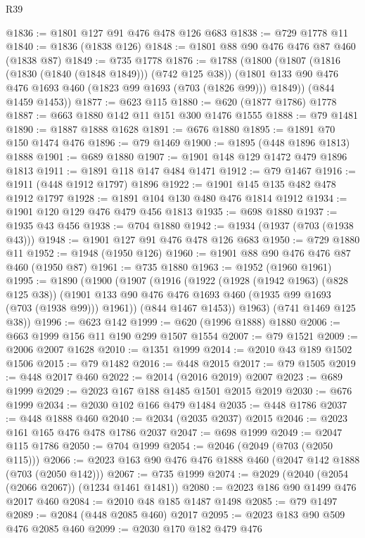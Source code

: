 \begin{lexlean}{R39}
\begin{coremodule}
@1836 := @1801 @127 @91 @476 @478 @126 @683
@1838 := @729 @1778 @11
@1840 := @1836 (@1838 @126)
@1848 := @1801 @88 @90 @476 @476 @87 @460 (@1838 @87)
@1849 := @735 @1778
@1876 := @1788
    (@1800
      (@1807
        (@1816 (@1830 (@1840 (@1848 @1849))) (@742 @125 @38))
        (@1801 @133 @90 @476 @476 @1693 @460 (@1823 @99 @1693 (@703 (@1826 @99))) @1849))
      (@844 @1459 @1453))
@1877 := @623 @115
@1880 := @620 (@1877 @1786) @1778
@1887 := @663 @1880 @142 @11 @151 @300 @1476 @1555
@1888 := @79 @1481
@1890 := @1887 @1888 @1628
@1891 := @676 @1880
@1895 := @1891 @70 @150 @1474 @476
@1896 := @79 @1469
@1900 := @1895 (@448 @1896 @1813) @1888
@1901 := @689 @1880
@1907 := @1901 @148 @129 @1472 @479 @1896 @1813
@1911 := @1891 @118 @147 @484 @1471
@1912 := @79 @1467
@1916 := @1911 (@448 @1912 @1797) @1896
@1922 := @1901 @145 @135 @482 @478 @1912 @1797
@1928 := @1891 @104 @130 @480 @476 @1814 @1912
@1934 := @1901 @120 @129 @476 @479 @456 @1813
@1935 := @698 @1880
@1937 := @1935 @43 @456
@1938 := @704 @1880
@1942 := @1934 (@1937 (@703 (@1938 @43)))
@1948 := @1901 @127 @91 @476 @478 @126 @683
@1950 := @729 @1880 @11
@1952 := @1948 (@1950 @126)
@1960 := @1901 @88 @90 @476 @476 @87 @460 (@1950 @87)
@1961 := @735 @1880
@1963 := @1952 (@1960 @1961)
@1995 := @1890
    (@1900
      (@1907
        (@1916
          (@1922
            (@1928 (@1942 @1963) (@828 @125 @38))
            (@1901 @133 @90 @476 @476 @1693 @460 (@1935 @99 @1693 (@703 (@1938 @99))) @1961))
          (@844 @1467 @1453))
        @1963)
      (@741 @1469 @125 @38))
@1996 := @623 @142
@1999 := @620 (@1996 @1888) @1880
@2006 := @663 @1999 @156 @11 @190 @299 @1507 @1554
@2007 := @79 @1521
@2009 := @2006 @2007 @1628
@2010 := @1351 @1999
@2014 := @2010 @43 @189 @1502 @1506
@2015 := @79 @1482
@2016 := @448 @2015
@2017 := @79 @1505
@2019 := @448 @2017 @460
@2022 := @2014 (@2016 @2019) @2007
@2023 := @689 @1999
@2029 := @2023 @167 @188 @1485 @1501 @2015 @2019
@2030 := @676 @1999
@2034 := @2030 @102 @166 @479 @1484
@2035 := @448 @1786
@2037 := @448 @1888 @460
@2040 := @2034 (@2035 @2037) @2015
@2046 := @2023 @161 @165 @476 @478 @1786 @2037
@2047 := @698 @1999
@2049 := @2047 @115 @1786
@2050 := @704 @1999
@2054 := @2046 (@2049 (@703 (@2050 @115)))
@2066 := @2023 @163 @90 @476 @476 @1888 @460 (@2047 @142 @1888 (@703 (@2050 @142)))
@2067 := @735 @1999
@2074 := @2029 (@2040 (@2054 (@2066 @2067)) (@1234 @1461 @1481))
@2080 := @2023 @186 @90 @1499 @476 @2017 @460
@2084 := @2010 @48 @185 @1487 @1498
@2085 := @79 @1497
@2089 := @2084 (@448 @2085 @460) @2017
@2095 := @2023 @183 @90 @509 @476 @2085 @460
@2099 := @2030 @170 @182 @479 @476

\end{coremodule}
\end{lexlean}

